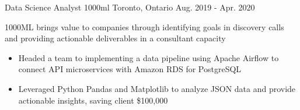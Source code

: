 

\begin{cventries}

    \cventry
    { Data Science Analyst} %
    {1000ml} %
    {Toronto, Ontario} %
    {Aug. 2019 - Apr. 2020} %
    {
      \begin{cvitems} %
        \item[] {1000ML brings value to companies through identifying goals in discovery calls and providing actionable deliverables in a consultant capacity}
        \begin{itemize}
        \item {Headed a team to implementing a data pipeline using Apache Airflow to connect API microservices with Amazon RDS for PostgreSQL}
        \item {Leveraged Python Pandas and Matplotlib to analyze JSON data and provide actionable insights, saving client \$100,000}
        \end{itemize}
      \end{cvitems}
    }


\end{cventries}
